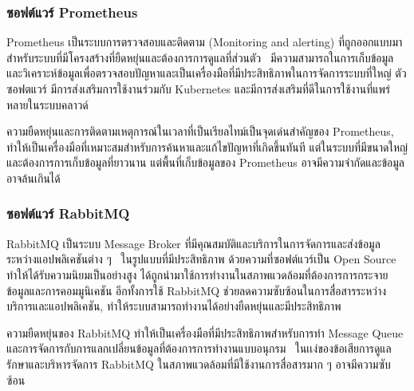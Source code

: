 \documentclass[12pt,one side,openright,a4paper]{cpe-thesis-th}
\newcommand{\thaijustify}[1]{%
  \par\hspace{30pt}\justifying
  #1
}
\begin{document}
        \subsubsection{ซอฟต์แวร์ Prometheus}
            \thaijustify{
                Prometheus เป็นระบบการตรวจสอบและติดตาม (Monitoring and alerting) ที่ถูกออกแบบมาสำหรับระบบที่มีโครงสร้างที่ยืดหยุ่นและต้องการการดูแลที่ส่วนตัว~\cite{prometheus} มีความสามารถในการเก็บข้อมูลและวิเคราะห์ข้อมูลเพื่อตรวจสอบปัญหาและเป็นเครื่องมือที่มีประสิทธิภาพในการจัดการระบบที่ใหญ่ ตัวซอฟตแวร์ มีการส่งเสริมการใช้งานร่วมกับ Kubernetes และมีการส่งเสริมที่ดีในการใช้งานที่แพร่หลายในระบบคลาวด์
            }
            \thaijustify{
                ความยืดหยุ่นและการติดตามเหตุการณ์ในเวลาที่เป็นเรียลไทม์เป็นจุดเด่นสำคัญของ Prometheus, ทำให้เป็นเครื่องมือที่เหมาะสมสำหรับการค้นหาและแก้ไขปัญหาที่เกิดขึ้นทันที แต่ในระบบที่มีขนาดใหญ่และต้องการการเก็บข้อมูลที่ยาวนาน แต่พื้นที่เก็บข้อมูลของ Prometheus อาจมีความจำกัดและข้อมูลอาจล้นเกินได้
            }
        \subsubsection{ซอฟต์แวร์ RabbitMQ}
            \thaijustify{
                RabbitMQ เป็นระบบ Message Broker ที่มีคุณสมบัติและบริการในการจัดการและส่งข้อมูลระหว่างแอปพลิเคชันต่าง ๆ~\cite{rabbitmq} ในรูปแบบที่มีประสิทธิภาพ ด้วยความที่ซอฟต์แวร์เป็น Open Source ทำให้ได้รับความนิยมเป็นอย่างสูง ได้ถูกนำมาใช้การทำงานในสภาพแวดล้อมที่ต้องการการกระจายข้อมูลและการคอมมูนิเคชัน อีกทั้งการใช้ RabbitMQ ช่วยลดความซับซ้อนในการสื่อสารระหว่างบริการและแอปพลิเคชัน, ทำให้ระบบสามารถทำงานได้อย่างยืดหยุ่นและมีประสิทธิภาพ~\cite{rabbitmq}
            }
            \thaijustify{
                ความยืดหยุ่นของ RabbitMQ ทำให้เป็นเครื่องมือที่มีประสิทธิภาพสำหรับการทำ Message Queue และการจัดการกับการแลกเปลี่ยนข้อมูลที่ต้องการการทำงานแบบอนุกรม~\cite{roy17rabbitmq} ในเเง่ของข้อเสียการดูแลรักษาและบริหารจัดการ RabbitMQ ในสภาพแวดล้อมที่มีใช้งานการสื่อสารมาก ๆ อาจมีความซับซ้อน~\cite{hanwell17rabbitmq}
            }
\end{document}
